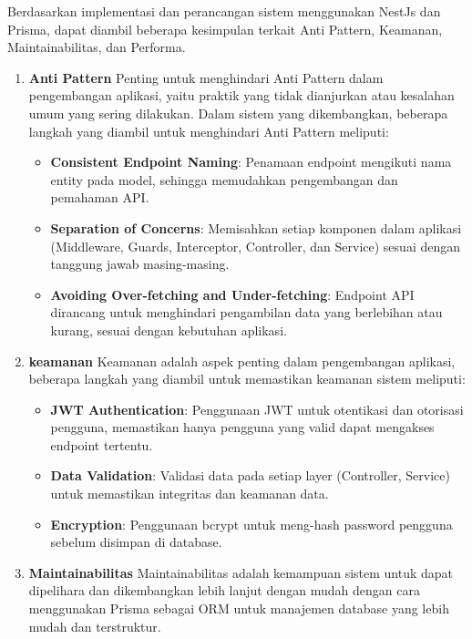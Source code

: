 Berdasarkan implementasi dan perancangan sistem menggunakan NestJs dan Prisma, dapat diambil beberapa kesimpulan terkait Anti Pattern, Keamanan, Maintainabilitas, dan Performa.
\begin{enumerate}
  \item \textbf{Anti Pattern}\newline
  Penting untuk menghindari Anti Pattern dalam pengembangan aplikasi, yaitu praktik yang tidak dianjurkan atau kesalahan umum yang sering dilakukan. Dalam sistem yang dikembangkan, beberapa langkah yang diambil untuk menghindari Anti Pattern meliputi:
  \begin{itemize}
    \item \textbf{Consistent Endpoint Naming}: Penamaan endpoint mengikuti nama entity pada model, sehingga memudahkan pengembangan dan pemahaman API.
    \item \textbf{Separation of Concerns}: Memisahkan setiap komponen dalam aplikasi (Middleware, Guards, Interceptor, Controller, dan Service) sesuai dengan tanggung jawab masing-masing.
    \item \textbf{Avoiding Over-fetching and Under-fetching}: Endpoint API dirancang untuk menghindari pengambilan data yang berlebihan atau kurang, sesuai dengan kebutuhan aplikasi.
  \end{itemize}
  \item \textbf{keamanan}\newline
  Keamanan adalah aspek penting dalam pengembangan aplikasi, beberapa langkah yang diambil untuk memastikan keamanan sistem meliputi:
  \begin{itemize}
    \item \textbf{JWT Authentication}: Penggunaan JWT untuk otentikasi dan otorisasi pengguna, memastikan hanya pengguna yang valid dapat mengakses endpoint tertentu.
    \item \textbf{Data Validation}: Validasi data pada setiap layer (Controller, Service) untuk memastikan integritas dan keamanan data.
    \item \textbf{Encryption}: Penggunaan bcrypt untuk meng-hash password pengguna sebelum disimpan di database.
  \end{itemize}
  \item \textbf{Maintainabilitas}\newline
  Maintainabilitas adalah kemampuan sistem untuk dapat dipelihara dan dikembangkan lebih lanjut dengan mudah dengan cara menggunakan Prisma sebagai ORM untuk manajemen database yang lebih mudah dan terstruktur.
\end{enumerate}

